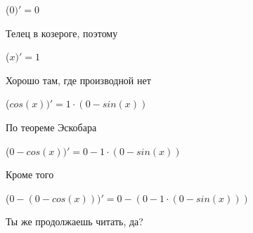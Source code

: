 \documentclass[12pt,a4paper,fleqn]{article}
\begin{document}
\begin{center}
\begin{center}
\begin{center}
\begin{center}
\begin{center}
\begin{center}
\begin{center}
\begin{center}
\begin{center}
\begin{center}
\begin{center}
\begin{center}
\begin{center}
\begin{center}
\begin{center}
\begin{center}
\begin{center}
\begin{center}
\begin{center}
\begin{center}
\begin{center}
\begin{center}
\begin{center}
\begin{center}
\begin{center}
\begin{center}
\begin{center}
\begin{center}
\begin{center}
\begin{center}
\begin{center}
\begin{center}
\begin{center}
\begin{center}
\begin{center}
\begin{center}
\begin{center}
\begin{center}
\begin{center}
\begin{center}
\begin{center}
\begin{center}
\begin{center}
\begin{center}
\begin{center}
\begin{center}
\begin{center}
\begin{center}
\begin{center}
\begin{center}
\begin{center}
\begin{center}
\begin{center}
\begin{center}
\begin{center}
\begin{center}
\begin{center}
\begin{center}
\begin{center}
\begin{center}
\begin{center}
\begin{center}
\begin{center}
\begin{center}
\begin{center}
\begin{center}
\begin{center}
\begin{center}
\begin{center}
\begin{center}
\begin{center}
\begin{center}
\begin{center}
\begin{center}
\begin{center}
\begin{center}
\begin{center}
\begin{center}
\begin{center}
\begin{center}
\begin{center}
 ($0)'
  = 0$\end{center}
Телец в козероге, поэтому

\begin{center}
 ($x)'
  = 1$\end{center}
Хорошо там, где производной нет\cite{link2}

\begin{center}
 ($cos(x))'
  = 1 \cdot (0-sin(x))$\end{center}
По теореме Эскобара

\begin{center}
 ($0-cos(x))'
  = 0-1 \cdot (0-sin(x))$\end{center}
Кроме того

\begin{center}
 ($0-(0-cos(x)))'
  = 0-(0-1 \cdot (0-sin(x)))$\end{center}
Ты же продолжаешь читать, да?


\end{center}
\end{center}
\end{center}
\end{center}
\end{center}
\end{center}
\end{center}
\end{center}
\end{center}
\end{center}
\end{center}
\end{center}
\end{center}
\end{center}
\end{center}
\end{center}
\end{center}
\end{center}
\end{center}
\end{center}
\end{center}
\end{center}
\end{center}
\end{center}
\end{center}
\end{center}
\end{center}
\end{center}
\end{center}
\end{center}
\end{center}
\end{center}
\end{center}
\end{center}
\end{center}
\end{center}
\end{center}
\end{center}
\end{center}
\end{center}
\end{center}
\end{center}
\end{center}
\end{center}
\end{center}
\end{center}
\end{center}
\end{center}
\end{center}
\end{center}
\end{center}
\end{center}
\end{center}
\end{center}
\end{center}
\end{center}
\end{center}
\end{center}
\end{center}
\end{center}
\end{center}
\end{center}
\end{center}
\end{center}
\end{center}
\end{center}
\end{center}
\end{center}
\end{center}
\end{center}
\end{center}
\end{center}
\end{center}
\end{center}
\end{center}
\end{center}
\end{center}
\end{center}
\end{center}
\end{center}
\end{document}
